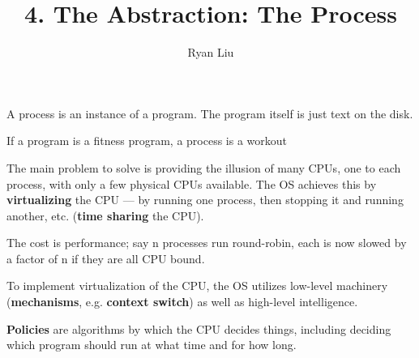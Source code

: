 \documentclass{article}
\title{4. The Abstraction: The Process}
\author{Ryan Liu}
\begin{document}
\maketitle
\thispagestyle{empty}
\newpage
{}

\setcounter{section}{4}
\section*{}

A process is an instance of a program.
The program itself is just text on the disk.

If a program is a fitness program, a process is a workout

The main problem to solve is providing the illusion of many CPUs, one to each process, with only a few physical CPUs available.
The OS achieves this by \textbf{virtualizing} the CPU --- by running one process, then stopping it and running another, etc. (\textbf{time sharing} the CPU).

The cost is performance; say n processes run round-robin, each is now slowed by a factor of n if they are all CPU bound.

To implement virtualization of the CPU, the OS utilizes low-level machinery (\textbf{mechanisms}, e.g. \textbf{context switch}) as well as high-level intelligence.

\textbf{Policies} are algorithms by which the CPU decides things, including deciding which program should run at what time and for how long.
\end{document}

